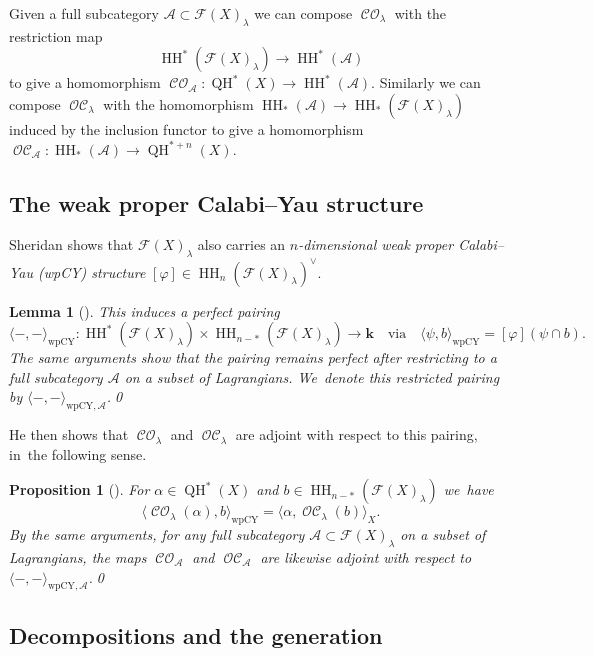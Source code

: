 \documentclass[10pt]{amsart}
\newtheorem{lemma}[theorem]{Lemma}
\newtheorem{proposition}[theorem]{Proposition}
\theoremstyle{definition}
\let\phi\varphi
\newcommand{\calA}{\mathcal{A}}
\newcommand{\Fuk}{\mathcal{F}}
\newcommand{\kk}{{\boldsymbol{k}}}
\newcommand{\HH}{\operatorname{HH}}
\newcommand{\CO}{\operatorname{\mathcal{CO}}}
\newcommand{\OC}{\operatorname{\mathcal{OC}}}
\newcommand{\QH}{\operatorname{QH}}
\begin{document}
Given a full subcategory $\calA \subset \Fuk(X)_\lambda$ we can compose $\CO_\lambda$ with the restriction map
\[
\HH^*(\Fuk(X)_\lambda) \to \HH^*(\calA)
\]
to give a homomorphism $\CO_\calA : \QH^*(X) \to \HH^*(\calA)$. Similarly we can compose $\OC_\lambda$ with the homomorphism $\HH_*(\calA) \to \HH_*(\Fuk(X)_\lambda)$ induced by the inclusion functor to give a homomorphism $\OC_\calA : \HH_*(\calA) \to \QH^{*+n}(X)$.

\subsection{The weak proper Calabi--Yau structure}
\label{sscwpCY}

Sheridan shows \cite[\S 2.8]{SheridanFano} that $\Fuk(X)_\lambda$ also carries an \emph{$n$-dimensional weak proper Calabi--Yau (wpCY) structure} $[\phi] \in \HH_n(\Fuk(X)_\lambda)^\vee$.

\begin{lemma}[{\cite[Lem.\,A.2]{SheridanFano}}]
\label{lemwpCY}
This induces a perfect pairing
\[
\langle{-}, {-}\rangle_\mathrm{wpCY} : \HH^*(\Fuk(X)_\lambda) \times \HH_{n-*}(\Fuk(X)_\lambda) \to \kk \quad \text{via} \quad \langle \psi, b \rangle_\mathrm{wpCY} = [\phi] (\psi \cap b).
\]
The same arguments show that the pairing remains perfect after restricting to a full subcategory $\calA$ on a subset of Lagrangians. We~denote this restricted pairing by $\langle{-}, {-}\rangle_{\mathrm{wpCY}, \calA}$.\qed
\end{lemma}

He then shows that $\CO_\lambda$ and $\OC_\lambda$ are adjoint with respect to this pairing, in~the following sense.

\begin{proposition}[{\cite[Prop.\,2.6]{SheridanFano}}]
\label{propCOOCduality}
For $\alpha \!\in\! \QH^*(X)$ and $b \!\in\! \HH_{n-*}(\Fuk(X)_\lambda)$ we~have
\[
\langle \CO_\lambda(\alpha), b\rangle_\mathrm{wpCY} = \langle \alpha, \OC_\lambda(b) \rangle_X.
\]
By the same arguments, for any full subcategory $\calA \subset \Fuk(X)_\lambda$ on a subset of Lagrangians, the maps $\CO_\calA$ and $\OC_\calA$ are likewise adjoint with respect to $\langle {-}, {-}\rangle_{\mathrm{wpCY}, \calA}$.\qed
\end{proposition}

\subsection{Decompositions and the generation}
\end{document}
